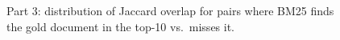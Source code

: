 \begin{figure}[ht]\centering

\caption{Part 3: distribution of Jaccard overlap for pairs where BM25 finds the gold document in the top-10 vs.\ misses it.}\label{fig:p3}\end{figure}
